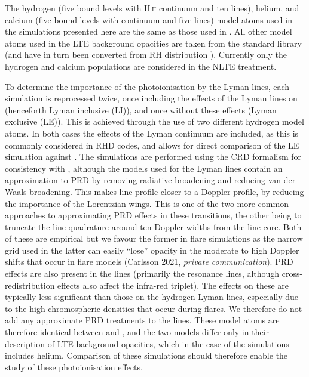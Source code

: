 The hydrogen (five bound levels with H\,\textsc{ii} continuum and ten lines), helium, and calcium (five bound \Caii{} levels with \Caiii{} continuum and five lines) model atoms used in the simulations presented here are the same as those used in \Radyn{}.
All other model atoms used in the LTE background opacities are taken from the \Lw{} standard library (and have in turn been converted from  RH distribution \citep{Uitenbroek2001}).
Currently only the hydrogen and calcium populations are considered in the NLTE treatment.

To determine the importance of the photoionisation by the Lyman lines, each \Radyn{} simulation is reprocessed twice, once including the effects of the Lyman lines on \Caii{} (henceforth Lyman inclusive (LI)), and once without these effects (Lyman exclusive (LE)).
This is achieved through the use of two different hydrogen model atoms.
In both cases the effects of the Lyman continuum are included, as this is commonly considered in RHD codes, and allows for direct comparison of the LE simulation against \Radyn{}.
The simulations are performed using the CRD formalism for consistency with \Radyn{}, although the models used for the Lyman lines contain an approximation to PRD by removing radiative broadening and reducing van der Waals broadening.
This makes line profile closer to a Doppler profile, by reducing the importance of the Lorentzian wings.
This is one of the two more common approaches to approximating PRD effects in these transitions, the other being to truncate the line quadrature around ten Doppler widths from the line core.
Both of these are empirical but we favour the former in flare simulations as the narrow grid used in the latter can easily ``lose'' opacity in the moderate to high Doppler shifts that occur in flare models (Carlsson 2021, \emph{private communication}).
PRD effects are also present in the \Caii{} lines (primarily the resonance lines, although cross-redistribution effects also affect the infra-red triplet).
The effects on these are typically less significant than those on the hydrogen Lyman lines, especially due to the high chromospheric densities that occur during flares.
We therefore do not add any approximate PRD treatments to the \Caii{} lines.
These model atoms are therefore identical between \Radyn{} and \Lw{}, and the two models differ only in their description of LTE background opacities, which in the case of the \Lw{} simulations includes helium.
Comparison of these simulations should therefore enable the study of these photoionisation effects.

